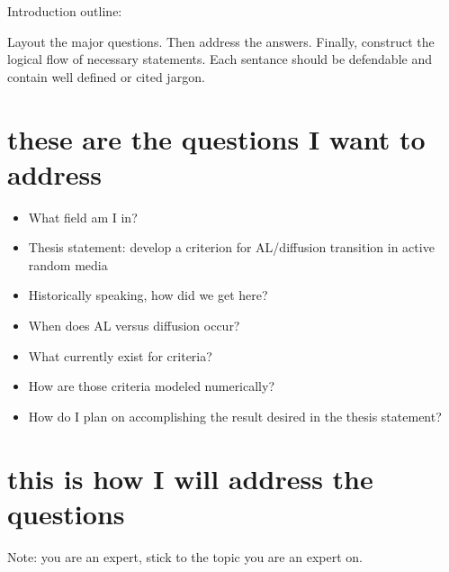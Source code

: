 \documentclass[pdftex]{article}
\begin{document}
Introduction outline: 

Layout the major questions. Then address the answers. Finally, construct the logical flow of necessary statements. Each sentance should be defendable and contain well defined or cited jargon. 

\section{these are the questions I want to address}

\begin{itemize}
 \item What field am I in?
 \item Thesis statement: develop a criterion for AL/diffusion transition in active random media
 \item Historically speaking, how did we get here?
 \item When does AL versus diffusion occur?
 \item What currently exist for criteria?
 \item How are those criteria modeled numerically?
 \item How do I plan on accomplishing the result desired in the thesis statement?
\end{itemize}

\section{this is how I will address the questions}
Note: you are an expert, stick to the topic you are an expert on. 
\end{document}
